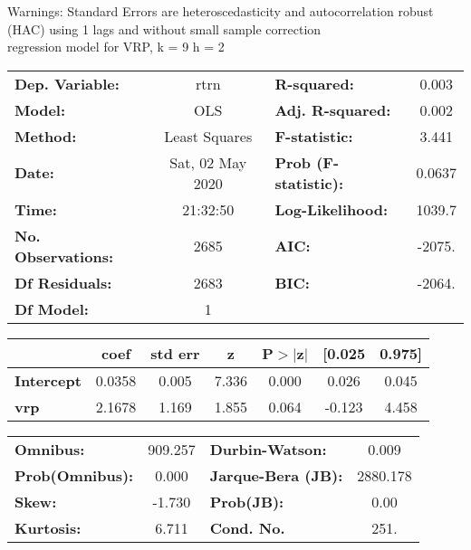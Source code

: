 Warnings: \newline
 [1] Standard Errors are heteroscedasticity and autocorrelation robust (HAC) using 1 lags and without small sample correction\\ 

regression model for VRP, k = 9 h = 2\begin{center}
\begin{tabular}{lclc}
\toprule
\textbf{Dep. Variable:}    &       rtrn       & \textbf{  R-squared:         } &     0.003   \\
\textbf{Model:}            &       OLS        & \textbf{  Adj. R-squared:    } &     0.002   \\
\textbf{Method:}           &  Least Squares   & \textbf{  F-statistic:       } &     3.441   \\
\textbf{Date:}             & Sat, 02 May 2020 & \textbf{  Prob (F-statistic):} &   0.0637    \\
\textbf{Time:}             &     21:32:50     & \textbf{  Log-Likelihood:    } &    1039.7   \\
\textbf{No. Observations:} &        2685      & \textbf{  AIC:               } &    -2075.   \\
\textbf{Df Residuals:}     &        2683      & \textbf{  BIC:               } &    -2064.   \\
\textbf{Df Model:}         &           1      & \textbf{                     } &             \\
\bottomrule
\end{tabular}
\begin{tabular}{lcccccc}
                   & \textbf{coef} & \textbf{std err} & \textbf{z} & \textbf{P$> |$z$|$} & \textbf{[0.025} & \textbf{0.975]}  \\
\midrule
\textbf{Intercept} &       0.0358  &        0.005     &     7.336  &         0.000        &        0.026    &        0.045     \\
\textbf{vrp}       &       2.1678  &        1.169     &     1.855  &         0.064        &       -0.123    &        4.458     \\
\bottomrule
\end{tabular}
\begin{tabular}{lclc}
\textbf{Omnibus:}       & 909.257 & \textbf{  Durbin-Watson:     } &    0.009  \\
\textbf{Prob(Omnibus):} &   0.000 & \textbf{  Jarque-Bera (JB):  } & 2880.178  \\
\textbf{Skew:}          &  -1.730 & \textbf{  Prob(JB):          } &     0.00  \\
\textbf{Kurtosis:}      &   6.711 & \textbf{  Cond. No.          } &     251.  \\
\bottomrule
\end{tabular}
\end{center}

